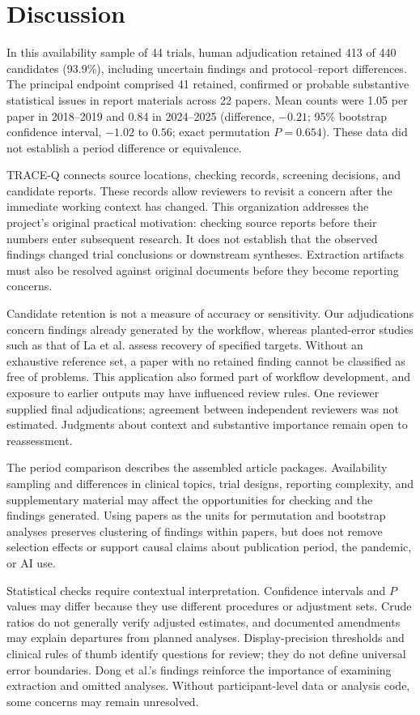 \section{Discussion}
In this availability sample of 44 trials, human adjudication retained 413 of 440 candidates (93.9\%), including uncertain findings and protocol--report differences. The principal endpoint comprised 41 retained, confirmed or probable substantive statistical issues in report materials across 22 papers. Mean counts were 1.05 per paper in 2018--2019 and 0.84 in 2024--2025 (difference, $-0.21$; 95\% bootstrap confidence interval, $-1.02$ to $0.56$; exact permutation $P=0.654$). These data did not establish a period difference or equivalence.

TRACE-Q connects source locations, checking records, screening decisions, and candidate reports. These records allow reviewers to revisit a concern after the immediate working context has changed. This organization addresses the project's original practical motivation: checking source reports before their numbers enter subsequent research. It does not establish that the observed findings changed trial conclusions or downstream syntheses. Extraction artifacts must also be resolved against original documents before they become reporting concerns.

Candidate retention is not a measure of accuracy or sensitivity. Our adjudications concern findings already generated by the workflow, whereas planted-error studies such as that of La et al. assess recovery of specified targets.\cite{la2026consistency} Without an exhaustive reference set, a paper with no retained finding cannot be classified as free of problems. This application also formed part of workflow development, and exposure to earlier outputs may have influenced review rules. One reviewer supplied final adjudications; agreement between independent reviewers was not estimated. Judgments about context and substantive importance remain open to reassessment.

The period comparison describes the assembled article packages. Availability sampling and differences in clinical topics, trial designs, reporting complexity, and supplementary material may affect the opportunities for checking and the findings generated. Using papers as the units for permutation and bootstrap analyses preserves clustering of findings within papers, but does not remove selection effects or support causal claims about publication period, the pandemic, or AI use.

Statistical checks require contextual interpretation. Confidence intervals and $P$ values may differ because they use different procedures or adjustment sets. Crude ratios do not generally verify adjusted estimates, and documented amendments may explain departures from planned analyses. Display-precision thresholds and clinical rules of thumb identify questions for review; they do not define universal error boundaries. Dong et al.'s findings reinforce the importance of examining extraction and omitted analyses.\cite{dong2026statistical} Without participant-level data or analysis code, some concerns may remain unresolved.

